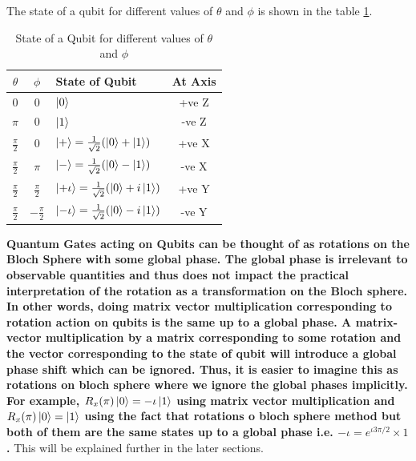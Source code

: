 \begin{example}
    The state of a qubit for different values of $\theta$ and $\phi$ is shown in the table \ref{tab:bloch_sphere}.
    \begin{table}[ht]
        \centering
        \begin{tabular}{|c|c|>{\centering\arraybackslash}m{8cm}|c|}
            \hline
            $\theta$ & $\phi$ & State of Qubit & At Axis\\
            \hline
            0 & 0 & $\ket{0}$ & +ve Z\\
            $\pi$ & 0 & $\ket{1}$ & -ve Z \\
            $\frac{\pi}{2}$ & 0 & $\ket{+} = \frac{1}{\sqrt{2}}(\ket{0} + \ket{1})$ & +ve X\\
            $\frac{\pi}{2}$ & $\pi$ & $\ket{-} = \frac{1}{\sqrt{2}}(\ket{0} - \ket{1})$ & -ve X\\
            $\frac{\pi}{2}$ & $\frac{\pi}{2}$ & $\ket{+\iota}=\frac{1}{\sqrt{2}}(\ket{0} + i\ket{1})$ & +ve Y \\
            $\frac{\pi}{2}$ & $-\frac{\pi}{2}$ & $\ket{-\iota}=\frac{1}{\sqrt{2}}(\ket{0} - i\ket{1})$ & -ve Y\\
            \hline
        \end{tabular}
        \caption{State of a Qubit for different values of $\theta$ and $\phi$}
        \label{tab:bloch_sphere}
    \end{table}
\end{example}

\textbf{Quantum Gates acting on Qubits can be thought of as rotations on the Bloch Sphere with some global phase. The global phase is irrelevant to observable quantities and thus does not impact the practical interpretation of the rotation as a transformation on the Bloch sphere. In other words, doing matrix vector multiplication corresponding to rotation action on qubits is the same up to a global phase. A matrix-vector multiplication by a matrix corresponding to some rotation and the vector corresponding to the state of qubit will introduce a global phase shift which can be ignored. Thus, it is easier to imagine this as rotations on bloch sphere where we ignore the global phases implicitly. For example, $R_x(\pi)\ket{0}=-\iota \ket{1}$ using matrix vector multiplication and $R_x(\pi)\ket{0} = \ket{1}$ using the fact that rotations o bloch sphere method but both of them are the same states up to a global phase i.e. $-\iota = e^{\iota 3\pi/2} \times 1$.}
This will be explained further in the later sections.

